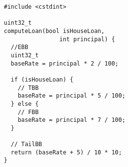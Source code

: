 \begin{minipage}{0.50\textwidth}
    \begin{lstlisting}[style=CStyle]
#include <cstdint>

uint32_t 
computeLoan(bool isHouseLoan, 
                int principal) {
  //EBB
  uint32_t
  baseRate = principal * 2 / 100;

  if (isHouseLoan) {
    // TBB
    baseRate = principal * 5 / 100;
  } else {
    // FBB
    baseRate = principal * 7 / 100;
  }

  // TailBB
  return (baseRate + 5) / 10 * 10;
}
    \end{lstlisting}
\end{minipage}%
\hspace{1cm} %
\begin{minipage}{0.40\textwidth}
\end{minipage}